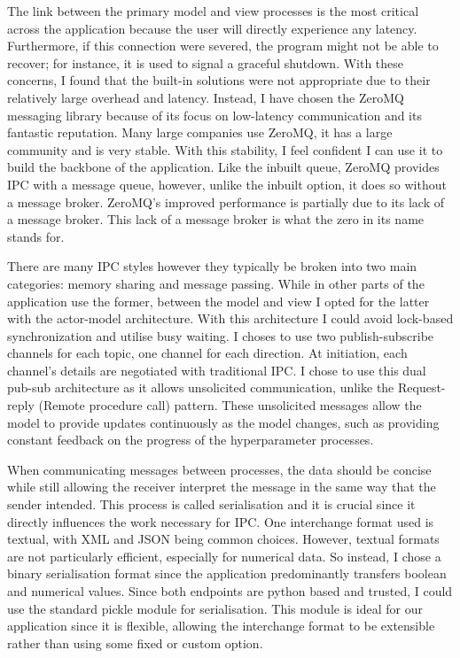\documentclass[]{final_report}
\begin{document}
The link between the primary model and view processes is the most critical across the application because the user will directly experience any latency. Furthermore, if this connection were severed, the program might not be able to recover; for instance, it is used to signal a graceful shutdown. With these concerns, I found that the built-in solutions were not appropriate due to their relatively large overhead and latency. Instead, I have chosen the ZeroMQ messaging library because of its focus on low-latency communication and its fantastic reputation. Many large companies use ZeroMQ, it has a large community and is very stable. With this stability, I feel confident I can use it to build the backbone of the application. Like the inbuilt queue, ZeroMQ provides IPC with a message queue, however, unlike the inbuilt option, it does so without a message broker.  ZeroMQ's improved performance is partially due to its lack of a message broker. This lack of a message broker is what the zero in its name stands for.

There are many IPC styles however they typically be broken into two main categories: memory sharing and message passing. While in other parts of the application use the former, between the model and view I opted for the latter with the actor-model architecture. With this architecture I could avoid  lock-based synchronization and utilise busy waiting. I choses to use two publish-subscribe channels for each topic, one channel for each direction. At initiation, each channel's details are negotiated with traditional IPC. I chose to use this dual pub-sub architecture as it allows unsolicited communication, unlike the Request-reply (Remote procedure call) pattern. These unsolicited messages allow the model to provide updates continuously as the model changes, such as providing constant feedback on the progress of the hyperparameter processes. 

When communicating messages between processes, the data should be concise while still allowing the receiver interpret the message in the same way that the sender intended. This process is called serialisation and it is crucial since it directly influences the work necessary for IPC. One interchange format used is textual, with XML and JSON being common choices. However, textual formats are not particularly efficient, especially for numerical data. So instead, I chose a binary serialisation format since the application predominantly transfers boolean and numerical values. Since both endpoints are python based and trusted, I could use the standard pickle module for serialisation. This module is ideal for our application since it is flexible, allowing the interchange format to be extensible rather than using some fixed or custom option. 
\end{document}
